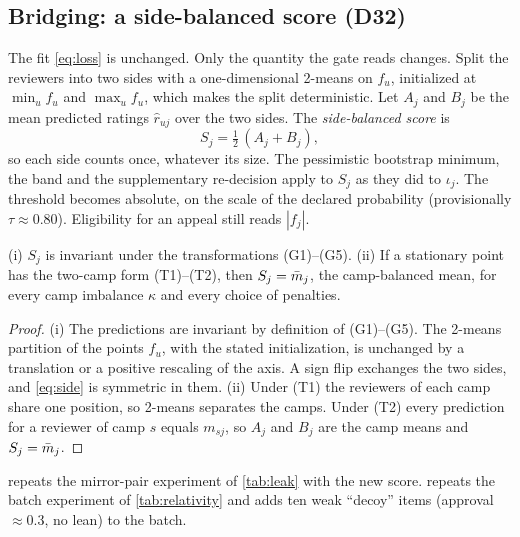 \subsection{Bridging: a side-balanced score (D32)}

The fit \eqref{eq:loss} is unchanged. Only the quantity the gate reads changes. Split the
reviewers into two sides with a one-dimensional 2-means on $f_u$, initialized at
$\min_uf_u$ and $\max_uf_u$, which makes the split deterministic. Let $A_j$ and $B_j$ be the mean
predicted ratings $\hat r_{uj}$ over the two sides. The \emph{side-balanced score} is
\begin{equation}\label{eq:side}
  S_j=\tfrac12\,(A_j+B_j),
\end{equation}
so each side counts once, whatever its size. The pessimistic bootstrap minimum, the band and the
supplementary re-decision apply to $S_j$ as they did to $\iota_j$. The threshold becomes absolute,
on the scale of the declared probability (provisionally $\tau\approx0.80$). Eligibility for an
appeal still reads $|f_j|$.

\begin{proposition}\label{prop:side}\proved{}
(i) $S_j$ is invariant under the transformations (G1)--(G5). (ii) If a stationary point has the
two-camp form (T1)--(T2), then $S_j=\bar m_j$, the camp-balanced mean, for every camp imbalance
$\kappa$ and every choice of penalties.
\end{proposition}
\begin{proof}
(i) The predictions are invariant by definition of (G1)--(G5). The 2-means partition of the
points $f_u$, with the stated initialization, is unchanged by a translation or a positive
rescaling of the axis. A sign flip exchanges the two sides, and \eqref{eq:side} is symmetric in
them. (ii) Under (T1) the reviewers of each camp share one position, so 2-means separates the
camps. Under (T2) every prediction for a reviewer of camp $s$ equals $m_{sj}$, so $A_j$ and $B_j$
are the camp means and $S_j=\bar m_j$.
\end{proof}

 repeats the mirror-pair experiment of \cref{tab:leak} with the new score.
 repeats the batch experiment of \cref{tab:relativity} and adds ten weak
``decoy'' items (approval $\approx0.3$, no lean) to the batch.

